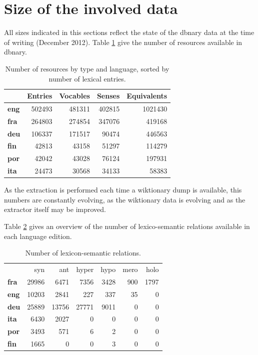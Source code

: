 \documentclass[sw]{iosart2c}
\begin{document}
\section{Size of the involved data}

All sizes indicated in this sections reflect the state of the dbnary data at the time of writing (December 2012). Table \ref{globalsize} give the number of resources available in dbnary.

\begin{table}[htb]
\begin{tabular}{lrrrr}
 & \textbf{Entries} & \textbf{Vocables} & \textbf{Senses} & \textbf{Equivalents}\\
 \hline
\textbf{eng} & 502493 & 481311 & 402815 & 1021430 \\
\textbf{fra} & 264803 & 274854 & 347076 & 419168 \\
\textbf{deu} & 106337 & 171517 & 90474 & 446563 \\
\textbf{fin} & 42813  & 43158 & 51297 & 114279 \\
\textbf{por} & 42042  & 43028 & 76124 & 197931 \\
\textbf{ita} & 24473  & 30568 & 34133 & 58383 \\
\end{tabular}
\caption{Number of resources by type and language, sorted by number of lexical entries.}\label{globalsize}
\end{table}

As the extraction is performed each time a wiktionary dump is available, this numbers are constantly evolving, as the wiktionary data is evolving and as the extractor itself may be improved.


Table \ref{nymsize} gives an overview of the number of lexico-semantic relations available in each language edition.

\begin{table}[htb]
\begin{tabular}{lrrrrrr}
 & syn  & ant & hyper & hypo & mero & holo \\
\textbf{fra} & 29986& 6471& 7356& 3428& 900& 1797 \\ 
\textbf{eng} & 10203  & 2841 & 227 & 337 & 35 & 0 \\
\textbf{deu} & 25889& 13756& 27771& 9011& 0& 0 \\ 
\textbf{ita} & 6430&  2027& 0& 0& 0& 0 \\ 
\textbf{por} & 3493&  571& 6& 2& 0& 0 \\ 
\textbf{fin} & 1665&  0& 0& 3& 0& 0 \\ 
\end{tabular}
\caption{Number of lexicon-semantic relations.}\label{nymsize}
\end{table}
\end{document}
